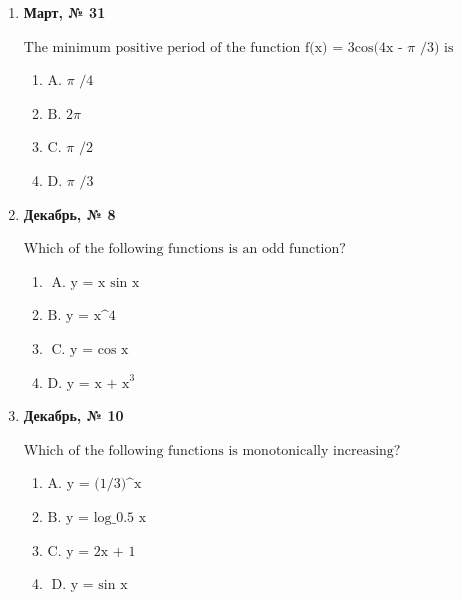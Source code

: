 \begin{enumerate}
\begin{enumerate}
\item $\displaystyle \text{A.  x < 0  When x<0 it's an increasing function}$
\item $\displaystyle \text{B.  x > 0  When x>0 it's an increasing function}$
\item $\displaystyle \text{C.  x }\in\text{  }\mathbb{R}\text{  When x}\in\text{ R is's a decreasing function}$
\item $\displaystyle \text{D.  x }\in\text{  }\mathbb{R}\text{  When x}\in\text{ R is's a increasing function}$
\end{enumerate}
\item \textbf{Март, № 31} \par \smallskip
$\displaystyle \text{The minimum positive period of the function f(x) = 3cos(4x - }\pi\text{ /3) is}$
\begin{enumerate}
\item $\displaystyle \text{A. }\pi\text{ /4}$
\item $\displaystyle \text{B. 2}\pi\text{ }$
\item $\displaystyle \text{C. }\pi\text{ /2}$
\item $\displaystyle \text{D. }\pi\text{ /3}$
\end{enumerate}
\item \textbf{Декабрь, № 8} \par \smallskip
$\displaystyle \text{Which of the following functions is an odd function?}$
\begin{enumerate}
\item $\displaystyle \text{A. y = x }\sin\text{ x}$
\item $\displaystyle \text{B. y = x^4}$
\item $\displaystyle \text{C. y = }\cos\text{ x}$
\item $\displaystyle \text{D. y = x + x}^{3}$
\end{enumerate}
\item \textbf{Декабрь, № 10} \par \smallskip
$\displaystyle \text{Which of the following functions is monotonically increasing?}$
\begin{enumerate}
\item $\displaystyle \text{A. y = (1/3)^x}$
\item $\displaystyle \text{B. y = log\_0.5 x}$
\item $\displaystyle \text{C. y = 2x + 1}$
\item $\displaystyle \text{D. y = }\sin\text{ x}$

\end{enumerate}
\end{enumerate}
